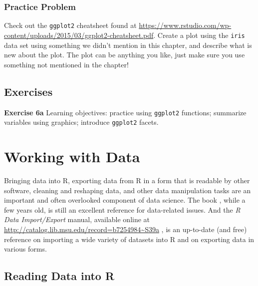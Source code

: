 \documentclass[]{krantz}
\begin{document}
\subsection{Practice Problem}\label{practice-problem-5}

Check out the \texttt{ggplot2} cheatsheet found at
\url{https://www.rstudio.com/wp-content/uploads/2015/03/ggplot2-cheatsheet.pdf}.
Create a plot using the \texttt{iris} data set using something we didn't
mention in this chapter, and describe what is new about the plot. The
plot can be anything you like, just make sure you use something not
mentioned in the chapter!

\section{Exercises}\label{exercises-2}

\textbf{Exercise 6a} Learning objectives: practice using
\texttt{ggplot2} functions; summarize variables using graphics;
introduce \texttt{ggplot2} facets.

\chapter{Working with Data}\label{data2}

Bringing data into R, exporting data from R in a form that is readable
by other software, cleaning and reshaping data, and other data
manipulation tasks are an important and often overlooked component of
data science. The book \citet{SpectorDataManipulation}, while a few
years old, is still an excellent reference for data-related issues. And
the \emph{R Data Import/Export} manual, available online at
\url{http://catalog.lib.msu.edu/record=b7254984~S39a} , is an up-to-date
(and free) reference on importing a wide variety of datasets into R and
on exporting data in various forms.

\section{Reading Data into R}\label{reading-data-into-r}
\end{document}
